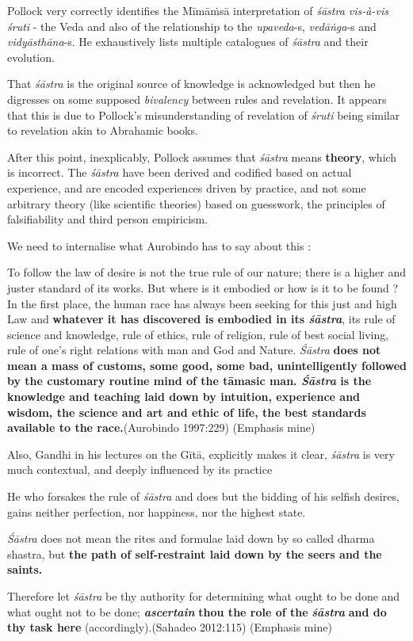 Pollock very correctly identifies the Mīmāṁsā interpretation of {\sl śāstra vis-à-vis śruti} - the Veda and also of the relationship to the {\sl upaveda}-s, {\sl vedāṅga}-s and  {\sl vidyāsthāna}-s. He exhaustively lists multiple catalogues of {\sl śāstra} and their evolution.

That {\sl śāstra} is the original source of knowledge is acknowledged but then he digresses on some supposed {\sl bivalency} between rules and revelation. It appears that this is due to Pollock's misunderstanding of revelation of {\sl śruti} being similar to revelation akin to Abrahamic books.

After this point, inexplicably, Pollock assumes that {\sl śāstra} means {\bf theory}, which is incorrect. The {\sl śāstra} have been derived and codified based on actual experience, and are encoded experiences driven by practice, and not some arbitrary theory (like scientific theories) based on guesswork, the principles of falsifiability and third person empiricism.

We need to internalise what Aurobindo has to say about this :
\begin{myquote}
To follow the law of desire is not the true rule of our nature; there is a higher and juster standard of its works. But where is it embodied or how is it to be found ? In the first place, the human race has always been seeking for this just and high Law and {\bf whatever it has discovered is embodied in its {{\sl\bfseries śāstra}\relax}}, its rule of science and knowledge, rule of ethics, rule of religion, rule of best social living, rule of one's right relations with man and God and Nature. {\sl Śāstra} {\bf does not mean a mass of customs, some good, some bad, unintelligently followed by the customary routine mind of the tāmasic man. {{\sl\bfseries Śāstra}\relax} is the knowledge and teaching laid down by intuition, experience and wisdom, the science and art and ethic of life, the best standards available to the race.}\hfill (Aurobindo 1997:229) (Emphasis mine)
\end{myquote}

Also, Gandhi in his lectures on the Gītā, explicitly makes it clear, {\sl śāstra} is very much contextual, and deeply influenced by its practice
\begin{myquote}
He who forsakes the rule of {\sl śāstra} and does but the bidding of his selfish desires, gains neither perfection, nor happiness, nor the highest state.

\newpage

{\sl Śāstra} does not mean the rites and formulae laid down by so called dharma shastra, but {\bf the path of self-restraint laid down by the seers and the saints.}

Therefore let {\sl śāstra} be thy authority for determining what ought to be done and what ought not to be done; {{\sl\bfseries ascertain}\relax} {\bf thou the role of the} {{\sl\bfseries śāstra}\relax} {\bf and do thy task here} (accordingly).\hfill (Sahadeo 2012:115) (Emphasis mine)
\end{myquote}

